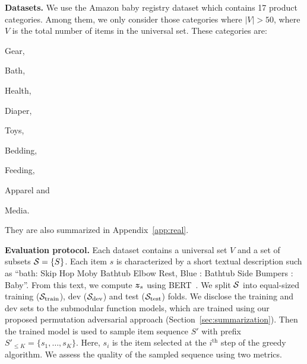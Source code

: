 \documentclass{article}
\newcommand{\xhdr}[1]{\noindent\textbf{#1.}}
\renewcommand{\cite}{\citep}
\begin{document}
\xhdr{Datasets} We use the Amazon baby registry dataset \cite{gillenwater2014expectation} which contains 17 product categories. Among them, we only consider those categories where $|V|>50$, where $V$ is the total number of items in the universal set.
These categories are:
\begin{enumerate*}[(i)]
\item Gear, \item Bath, \item Health, \item Diaper, \item Toys,
\item Bedding, \item Feeding, \item Apparel and \item Media.
\end{enumerate*}
They are also summarized in Appendix~\ref{app:real}. 

\xhdr{Evaluation protocol}
Each dataset contains a universal set $V$ and a set of subsets ${\mathcal{S}}=\left\{ S\right\}$.
Each item $s$ is characterized by a short textual description such as ``bath: Skip Hop Moby Bathtub Elbow Rest, Blue : Bathtub Side Bumpers : Baby''.
From this text, we compute $\bm{z}_s$ using BERT~\cite{devlin2018bert}.
We split ${\mathcal{S}}$ into equal-sized training (${\mathcal{S}}_{\text{train}}$), dev (${\mathcal{S}}_{\text{dev}}$) and test (${\mathcal{S}}_{\text{test}}$) folds.
We disclose the training and dev sets to the submodular function models, which are trained using our proposed permutation adversarial approach (Section~\ref{sec:summarization}).  Then  the trained model is used to sample item sequence $S'$ with prefix $S'_{\le K}=\{s_1,\ldots,s_K\}$.  Here, $s_i$ is the item selected at the $i^{\text{th}}$ step of the greedy algorithm.
We assess the quality of the sampled sequence using two metrics.
\end{document}
